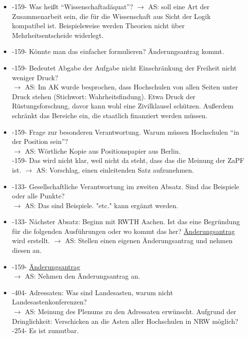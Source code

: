     \begin{itemize}
      \item -159- Was heißt ``Wissenschaftadäquat''?
        $\rightarrow$ AS: soll eine Art der Zusammenarbeit sein, die für die Wissenschaft aus Sicht der Logik kompatibel ist. Beispielsweise werden Theorien nicht über Mehrheitsentscheide widerlegt.
      \item -159- Könnte man das einfacher formulieren? Änderungsantrag kommt.
      \item -159- Bedeutet Abgabe der Aufgabe nicht Einschränkung der Freiheit nicht weniger Druck? \\
        $\rightarrow$ AS: Im AK wurde besprochen, dass Hochschulen von allen Seiten unter Druck stehen (Stichwort: Wahrheitsfindung). Etwa Druck der Rüstungsforschung, davor kann wohl eine Zivilklausel schützen. Außerdem schränkt das Bereiche ein, die staatlich finanziert werden müssen.
      \item -159- Frage zur besonderen Verantwortung. Warum müssen Hochschulen ``in der Position sein''? \\
        $\rightarrow$ AS: Wörtliche Kopie aus Positionspapier aus Berlin. \\
        -159- Das wird nicht klar, weil nicht da steht, dass das die Meinung der ZaPF ist.
        $\rightarrow$ AS: Vorschlag, einen einleitenden Satz aufzunehmen.
      \item -133- Gesellschaftliche Verantwortung im zweiten Absatz. Sind das Beispiele oder alle Punkte? \\
        $\rightarrow$ AS: Das sind Beispiele. "etc." kann ergänzt werden.
      \item -133- Nächster Absatz: Beginn mit RWTH Aachen. Ist das eine Begründung für die folgenden Ausführungen oder wo kommt das her? \underline{Änderungsantrag} wird erstellt.
        $\rightarrow$ AS: Stellen einen eigenen Änderungsantrag und nehmen diesen an.
      \item -159- \underline{Änderungsantrag} \\
        $\rightarrow$ AS: Nehmen den Änderungsantrag an.
      \item -404- Adressaten: Was sind Landesasten, warum nicht Landesastenkonferenzen? \\
        $\rightarrow$ AS: Meinung des Plenums zu den Adressaten erwünscht. Aufgrund der Dringlichkeit: Verschicken an die Asten aller Hochschulen in NRW möglich? \\
        -254- Es ist zumutbar. \\

\end{itemize}
